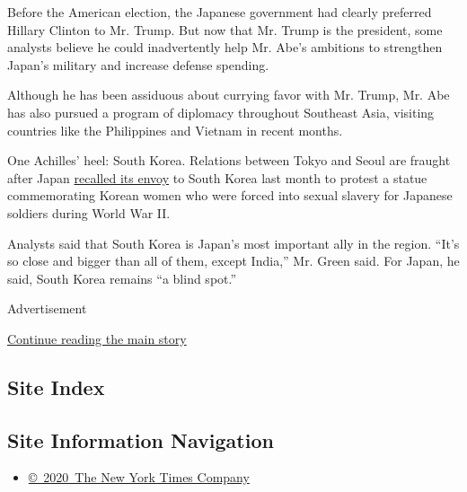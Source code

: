 Before the American election, the Japanese government had clearly
preferred Hillary Clinton to Mr. Trump. But now that Mr. Trump is the
president, some analysts believe he could inadvertently help Mr. Abe's
ambitions to strengthen Japan's military and increase defense spending.

Although he has been assiduous about currying favor with Mr. Trump, Mr.
Abe has also pursued a program of diplomacy throughout Southeast Asia,
visiting countries like the Philippines and Vietnam in recent months.

One Achilles' heel: South Korea. Relations between Tokyo and Seoul are
fraught after Japan
\href{https://www.nytimes3xbfgragh.onion/2017/01/06/world/asia/japan-south-korea-ambassador-comfort-woman-statue.html}{recalled
its envoy} to South Korea last month to protest a statue commemorating
Korean women who were forced into sexual slavery for Japanese soldiers
during World War II.

Analysts said that South Korea is Japan's most important ally in the
region. ``It's so close and bigger than all of them, except India,'' Mr.
Green said. For Japan, he said, South Korea remains ``a blind spot.''

Advertisement

\protect\hyperlink{after-bottom}{Continue reading the main story}

\hypertarget{site-index}{%
\subsection{Site Index}\label{site-index}}

\hypertarget{site-information-navigation}{%
\subsection{Site Information
Navigation}\label{site-information-navigation}}

\begin{itemize}
\tightlist
\item
  \href{https://help.nytimes3xbfgragh.onion/hc/en-us/articles/115014792127-Copyright-notice}{©~2020~The
  New York Times Company}
\end{itemize}

